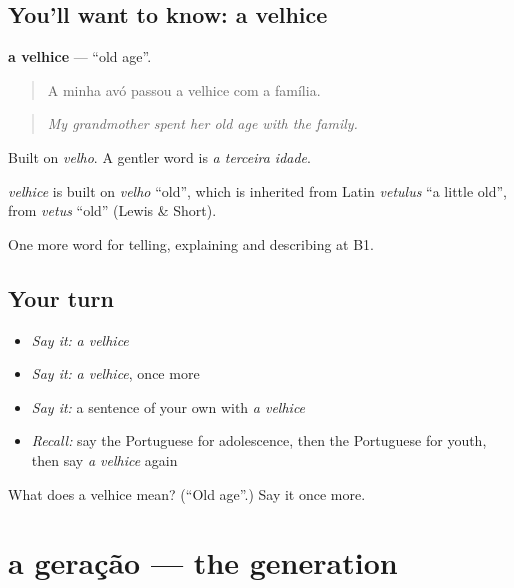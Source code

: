 \subsection*{You'll want to know: a velhice}
\textbf{a velhice} — \textquotedblleft{}old age\textquotedblright{}.

\begin{quote}
A minha avó passou a velhice com a família.
\end{quote}

\begin{quote}
\emph{My grandmother spent her old age with the family.}
\end{quote}

Built on \emph{velho}. A gentler word is \emph{a terceira idade}.

\begin{cousinweb}
\emph{velhice} is built on \emph{velho} \textquotedblleft{}old\textquotedblright{}, which is inherited from Latin \emph{vetulus} \textquotedblleft{}a little old\textquotedblright{}, from \emph{vetus} \textquotedblleft{}old\textquotedblright{} (Lewis \& Short).
\end{cousinweb}

\begin{grammarlens}[title={What you've built}]
One more word for telling, explaining and describing at B1.
\end{grammarlens}

\subsection*{Your turn}
\begin{itemize}
\raggedright
  \item \emph{Say it:} \emph{a velhice}
  \item \emph{Say it:} \emph{a velhice}, once more
  \item \emph{Say it:} a sentence of your own with \emph{a velhice}
  \item \emph{Recall:} say the Portuguese for adolescence, then the Portuguese for youth, then say \emph{a velhice} again
\end{itemize}

\begin{tcolorbox}[breakable,colback=teal!4,colframe=teal!35!black,title={Before you move on}]
What does a velhice mean? (\textquotedblleft{}Old age\textquotedblright{}.) Say it once more.
\end{tcolorbox}
\section[a geração]{a geração — the generation}

